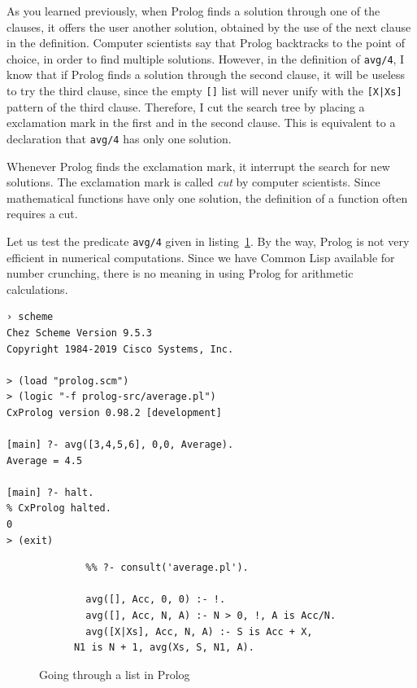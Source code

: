 \documentclass[a4paper,12pt]{book}
\newenvironment{fmpage}[1]
{\begin{lrbox}{\fmbox}\begin{minipage}{#1}}
{\end{minipage}\end{lrbox}\fbox{\usebox{\fmbox}}}
\begin{document}
As you learned previously, when Prolog finds a solution through
one of the clauses, it offers the user another solution, obtained
by the use of the next clause in the definition. Computer scientists
say that Prolog backtracks to the point of choice, in order
to find multiple solutions. However, in the definition of
\verb|avg/4|, I know that if Prolog finds a solution through
the second clause, it will be useless to try the third
clause, since the empty \verb|[]| list will never unify
with the \verb/[X|Xs]/ pattern of the third clause. Therefore,
I cut the search tree by placing a exclamation mark
in the first and in the second clause. This is equivalent
to a declaration that \verb|avg/4| has only one solution.

Whenever Prolog finds the exclamation mark, it interrupt
the search for new solutions. The exclamation mark is
called {\em cut} by computer scientists. Since mathematical
functions have only one solution, the definition of a function
often requires a cut.

\pagebreak
Let us test the predicate \verb|avg/4| given in
listing~\ref{prolog:average}. By the way, Prolog
is not very efficient in numerical computations.
Since we have Common Lisp available for number
crunching, there is no meaning in using Prolog
for arithmetic calculations.

\begin{verbatim}
› scheme
Chez Scheme Version 9.5.3
Copyright 1984-2019 Cisco Systems, Inc.

> (load "prolog.scm")
> (logic "-f prolog-src/average.pl")
CxProlog version 0.98.2 [development]

[main] ?- avg([3,4,5,6], 0,0, Average).
Average = 4.5

[main] ?- halt.
% CxProlog halted.
0
> (exit)
\end{verbatim}

\begin{figure}[!h]
	\begin{fmpage}{0.9\textwidth}
		\begin{verbatim}
		%% ?- consult('average.pl').

		avg([], Acc, 0, 0) :- !.
		avg([], Acc, N, A) :- N > 0, !, A is Acc/N.
		avg([X|Xs], Acc, N, A) :- S is Acc + X,
	  N1 is N + 1, avg(Xs, S, N1, A).
		\end{verbatim}
	\end{fmpage}
	\caption{Going through a list in Prolog}
	\label{prolog:average}
\end{figure}
\end{document}
